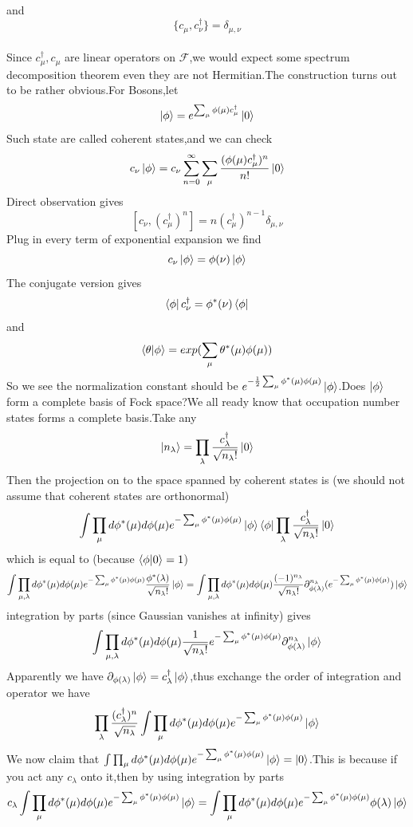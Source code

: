 \documentclass[a4paper,12pt]{article}
\theoremstyle{mystyle}
\theoremstyle{mystyle}
\numberwithin{equation}{section}
\begin{document}
	and
	$$\{c_\mu,c^\dagger_\nu\}=\delta_{\mu,\nu}$$
	\\
	Since $c^\dagger_\mu,c_\mu$ are linear operators on $\mathcal{F}$,we would expect some spectrum decomposition theorem even they are not Hermitian.The construction turns out to be rather obvious.For Bosons,let
	$$\ket{\phi}=e^{\sum_\mu \phi(\mu)c^\dagger_\mu}\ket{0}$$
	Such state are called coherent states,and we can check
	$$c_\nu \ket{\phi}=c_\nu \sum_{n=0}^\infty\sum_\mu \frac{(\phi(\mu )c^\dagger_\mu)^n}{n!}\ket{0}$$
	Direct observation gives
	$$[c_\nu,(c^\dagger_\mu)^n]=n(c_\mu^\dagger)^{n-1}\delta_{\mu,\nu}$$
	Plug in every term of exponential expansion we find
	$$c_\nu \ket{\phi}=\phi(\nu)\ket{\phi}$$
	The conjugate version gives
	$$\bra{\phi}c^\dagger_\nu=\phi^*(\nu)\bra{\phi}$$
	and
	$$\braket{\theta|\phi}=exp(\sum_{\mu}\theta^*(\mu)\phi(\mu))$$
	So we see the normalization constant should be $e^{-\frac{1}{2}\sum_\mu \phi^*(\mu)\phi(\mu)}\ket{\phi}$.Does $\ket{\phi}$ form a complete basis of Fock space?We all ready know that occupation number states forms a complete basis.Take any
	$$\ket{n_\lambda}=\prod_\lambda \frac{c_\lambda^\dagger}{\sqrt{n_\lambda!}}\ket{0}$$
	Then the projection on to the space spanned by coherent states is (we should not assume that coherent states are orthonormal)
	$$\int \prod_\mu d\phi^*(\mu)d\phi(\mu)e^{-\sum_\mu \phi^*(\mu)\phi(\mu)}\ket{\phi}\bra{\phi}\prod_\lambda \frac{c_\lambda^\dagger}{\sqrt{n_\lambda!}}\ket{0}$$
	which is equal to (because $\braket{\phi|0}=1$)
	$$\int \prod_{\mu,\lambda}d\phi^*(\mu)d\phi(\mu)e^{-\sum_\mu \phi^*(\mu)\phi(\mu)}\frac{\phi^*(\lambda)}{\sqrt{n_\lambda!}}\ket{\phi}=\int \prod_{\mu,\lambda}d\phi^*(\mu)d\phi(\mu)\frac{(-1)^{n_\lambda}}{\sqrt{n_\lambda !}}\partial^{n_\lambda}_{\phi(\lambda)}(e^{-\sum_\mu \phi^*(\mu)\phi(\mu)})\ket{\phi}$$
	integration by parts (since Gaussian vanishes at infinity) gives
	$$\int \prod_{\mu,\lambda}d\phi^*(\mu)d\phi(\mu)\frac{1}{\sqrt{n_\lambda!}}e^{-\sum_\mu \phi^*(\mu)\phi(\mu)}\partial^{n_\lambda}_{\phi(\lambda)}\ket{\phi}$$
	Apparently we have $\partial_{\phi(\lambda)}\ket{\phi}=c_\lambda^\dagger \ket{\phi}$,thus exchange the order of integration and operator we have
	$$\prod_\lambda \frac{(c_\lambda^\dagger)^n}{\sqrt{n_\lambda}}\int \prod_{\mu}d\phi^*(\mu)d\phi(\mu)e^{-\sum_\mu \phi^*(\mu)\phi(\mu)}\ket{\phi}$$ 
	We now claim that $\int \prod_{\mu}d\phi^*(\mu)d\phi(\mu)e^{-\sum_\mu \phi^*(\mu)\phi(\mu)}\ket{\phi}=\ket{0}$.This is because if you act any $c_\lambda$ onto it,then by using integration by parts
	$$c_\lambda \int \prod_{\mu}d\phi^*(\mu)d\phi(\mu)e^{-\sum_\mu \phi^*(\mu)\phi(\mu)}\ket{\phi}=\int \prod_{\mu}d\phi^*(\mu)d\phi(\mu)e^{-\sum_\mu \phi^*(\mu)\phi(\mu)}\phi(\lambda)\ket{\phi}$$
\end{document}
